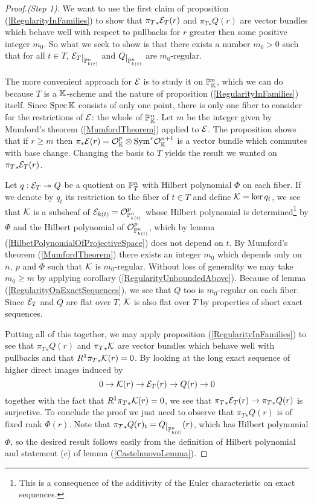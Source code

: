\begin{proof}[Proof.(Step 1)]
We want to use the first claim of proposition (\ref{RegularityInFamilies}) to show that ${\pi_T}_\ast\mathcal{E}_T(r)$ and ${\pi_T}_\ast Q(r)$ are vector bundles which behave well with respect to pullbacks for $r$ greater then some positive integer $m_0$. So what we seek to show is that there exists a number $m_0>0$ such that for all $t\in T$, $\Ec_T\res{\Pj^n_{k(t)}}$ and $Q\res{\Pj^n_{k(t)}}$ are $m_0$-regular. 

The more convenient approach for $\mathcal{E}$ is to study it on $\mathbb{P}^n_{\mathbb{K}}$, which we can do because $T$ is a $\mathbb{K}$-scheme and the nature of proposition (\ref{RegularityInFamilies}) itself. Since $\mathrm{Spec}\, \mathbb{K}$ consists of only one point, there is only one fiber to consider for the restrictions of $\mathcal{E}$: the whole of $\mathbb{P}^n_{\mathbb{K}}$. Let $m$ be the integer given by Mumford's theorem (\ref{MumfordTheorem}) applied to $\mathcal{E}$. The proposition shows that if $r\geq m$ then $\pi_\ast\mathcal{E}(r)=\mathcal{O}_{\mathbb{K}}^p\otimes\mathrm{Sym}^r\mathcal{O}_{\mathbb{K}}^{n+1}$ is a vector bundle which commutes with base change. Changing the basis to $T$ yields the result we wanted on ${\pi_T}_\ast\mathcal{E}_T(r)$.

Let $q:\mathcal{E}_T\twoheadrightarrow Q$ be a quotient on $\mathbb{P}^n_T$ with Hilbert polynomial $\Phi$ on each fiber. If we denote by $q_t$ its restriction to the fiber of $t\in T$ and define $\mathcal{K}=\ker q_t$, we see that $\mathcal{K}$ is a subsheaf of $\mathcal{E}_{k(t)}=\mathcal{O}_{\mathbb{P}^n_{k(t)}}^p$ whose Hilbert polynomial is determined\footnote{This is a consequence of the additivity of the Euler characteristic on exact sequences.} by $\Phi$ and the Hilbert polynomial of $\mathcal{O}_{\mathbb{P}^n_{k(t)}}^p$, which by lemma (\ref{HilbetPolynomialOfProjectiveSpace}) does not depend on $t$. By Mumford's theorem (\ref{MumfordTheorem}) there exists an integer $m_0$ which depends only on $n,\ p$ and $\Phi$ such that $\mathcal{K}$ is $m_0$-regular. Without loss of generality we may take $m_0\geq m$ by applying corollary (\ref{RegularityUnboundedAbove}). Because of lemma (\ref{RegularityOnExactSequences}), we see that $Q$ too is $m_0$-regular on each fiber. Since $\mathcal{E}_T$ and $Q$ are flat over $T$, $\mathcal{K}$ is also flat over $T$ by properties of short exact sequences. 

Putting all of this together, we may apply proposition (\ref{RegularityInFamilies}) to see that ${\pi_T}_\ast Q(r)$ and ${\pi_T}_\ast\mathcal{K}$ are vector bundles which behave well with pullbacks and that $R^1{\pi_T}_\ast \mathcal{K}(r)=0$. 
By looking at the long exact sequence of higher direct images induced by
\[0\to\mathcal{K}(r)\to\mathcal{E}_T(r)\to Q(r)\to 0\]
together with the fact that $R^1{\pi_T}_\ast \mathcal{K}(r)=0$, we see that ${\pi_T}_\ast\mathcal{E}_T(r)\to{\pi_T}_\ast Q(r)$ is surjective. To conclude the proof we just need to observe that ${\pi_T}_\ast Q(r)$ is of fixed rank $\Phi(r)$. Note that ${\pi_T}_\ast Q(r)_t=Q\res{\Pj^n_{k(t)}}(r)$, which has Hilbert polynomial $\Phi$, so the desired result follows easily from the definition of Hilbert polynomial and statement (c) of lemma (\ref{CastelnuovoLemma}).
\end{proof}

